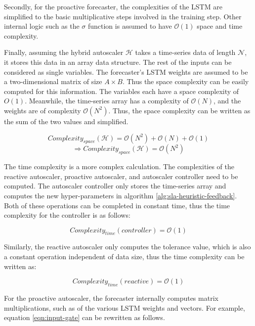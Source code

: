 Secondly, for the proactive forecaster, the complexities of the LSTM are simplified to the basic multiplicative steps involved in the training step. Other internal logic such as the $\sigma$ function is assumed to have $\mathcal{O}(1)$ space and time complexity.\par

Finally, assuming the hybrid autoscaler $\mathcal{H}$ takes a time-series data of length $\mathcal{N}$, it stores this data in an array data structure. The rest of the inputs can be considered as single variables. The forecaster's LSTM weights are assumed to be a two-dimensional matrix of size $A \times B$. Thus the space complexity can be easily computed for this information. The variables each have a space complexity of $O(1)$. Meanwhile, the time-series array has a complexity of $\mathcal{O}(N)$, and the weights are of complexity $\mathcal{O}(N^2)$. Thus, the space complexity can be written as the sum of the two values and simplified.

\[Complexity_{space}(\mathcal{H}) = \mathcal{O}(N^2) + \mathcal{O}(N) + \mathcal{O}(1)\]
\begin{equation}
    \Rightarrow Complexity_{space}(\mathcal{H}) = \mathcal{O}(N^2)
\end{equation}

The time complexity is a more complex calculation. The complexities of the reactive autoscaler, proactive autoscaler, and autoscaler controller need to be computed. The autoscaler controller only stores the time-series array and computes the new hyper-parameters in algorithm \ref{alg:sla-heuristic-feedback}. Both of these operations can be completed in constant time, thus the time complexity for the controller is as follows:

\begin{equation}
    Complexity_{time}(controller) = \mathcal{O}(1)
\end{equation}

Similarly, the reactive autoscaler only computes the tolerance value, which is also a constant operation independent of data size, thus the time complexity can be written as:

\begin{equation}
    Complexity_{time}(reactive) = \mathcal{O}(1)
\end{equation}

For the proactive autoscaler, the forecaster internally computes matrix multiplications, such as of the various LSTM weights and vectors. For example, equation \ref{eqn:input-gate} can be rewritten as follows.

